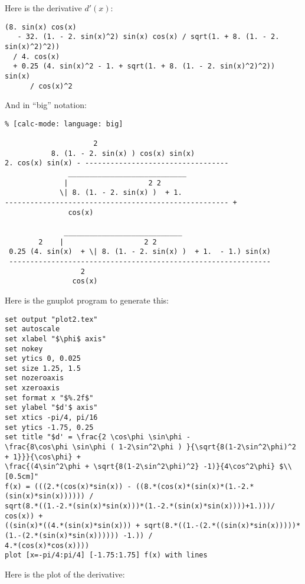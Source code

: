 Here is the derivative $d'(x)$:
\begin{verbatim}
(8. sin(x) cos(x) 
   - 32. (1. - 2. sin(x)^2) sin(x) cos(x) / sqrt(1. + 8. (1. - 2. sin(x)^2)^2)) 
  / 4. cos(x) 
  + 0.25 (4. sin(x)^2 - 1. + sqrt(1. + 8. (1. - 2. sin(x)^2)^2)) sin(x) 
      / cos(x)^2
\end{verbatim}

And in ``big'' notation:
\begin{verbatim}
% [calc-mode: language: big]

				     2
		   8. (1. - 2. sin(x) ) cos(x) sin(x)
2. cos(x) sin(x) - ----------------------------------
		       ____________________________    
		      |                   2 2          
		     \| 8. (1. - 2. sin(x) )  + 1.     
----------------------------------------------------- +
		       cos(x)                          

		      ____________________________             
		2    |                   2 2                   
 0.25 (4. sin(x)  + \| 8. (1. - 2. sin(x) )  + 1.  - 1.) sin(x)
 --------------------------------------------------------------
				  2                            
			    cos(x)                             
\end{verbatim}

\newpage

Here is the gnuplot program to generate this:

\begin{verbatim}
set output "plot2.tex"
set autoscale
set xlabel "$\phi$ axis"
set nokey
set ytics 0, 0.025
set size 1.25, 1.5
set nozeroaxis
set xzeroaxis
set format x "$%.2f$"
set ylabel "$d'$ axis"
set xtics -pi/4, pi/16
set ytics -1.75, 0.25
set title "$d' = \frac{2 \cos\phi \sin\phi -
\frac{8\cos\phi \sin\phi ( 1-2\sin^2\phi ) }{\sqrt{8(1-2\sin^2\phi)^2 + 1}}}{\cos\phi} +
\frac{(4\sin^2\phi + \sqrt{8(1-2\sin^2\phi)^2} -1)}{4\cos^2\phi} $\\[0.5cm]"
f(x) = (((2.*(cos(x)*sin(x)) - ((8.*(cos(x)*(sin(x)*(1.-2.*(sin(x)*sin(x)))))) /
sqrt(8.*((1.-2.*(sin(x)*sin(x)))*(1.-2.*(sin(x)*sin(x))))+1.)))/ cos(x)) +
((sin(x)*((4.*(sin(x)*sin(x))) + sqrt(8.*((1.-(2.*((sin(x)*sin(x)))))*(1.-(2.*(sin(x)*sin(x)))))) -1.)) /
4.*(cos(x)*cos(x))))
plot [x=-pi/4:pi/4] [-1.75:1.75] f(x) with lines
\end{verbatim}

Here is the plot of the derivative:

\begin{center}
	
\end{center}

